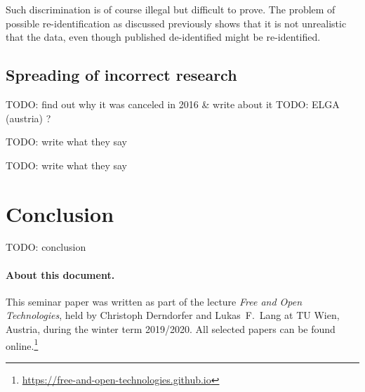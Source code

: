 \documentclass[a4paper, 11pt]{article}
\begin{document}
Such discrimination is of course illegal but difficult to prove. 
The problem of possible re-identification as discussed previously shows that it is not unrealistic that the data, even though published de-identified might be re-identified. \cite{Hoffman2015}

\subsection{Spreading of incorrect research}
\cite{Hoffman2015}


TODO: find out why it was canceled in 2016 & write about it
TODO: ELGA (austria) ?


TODO: write what they say
\cite{Vayena_et_al2015} 

TODO: write what they say
\cite{Fairchild631}

\section{Conclusion}\label{sec:conclusion}
TODO: conclusion







\paragraph{About this document.} This seminar paper was written as part of the lecture \emph{Free and Open Technologies}, held by Christoph Derndorfer and Lukas~F.\ Lang at TU Wien, Austria, during the winter term 2019/2020.
All selected papers can be found online.\footnote{\url{https://free-and-open-technologies.github.io}}

\doclicenseThis
\end{document}
